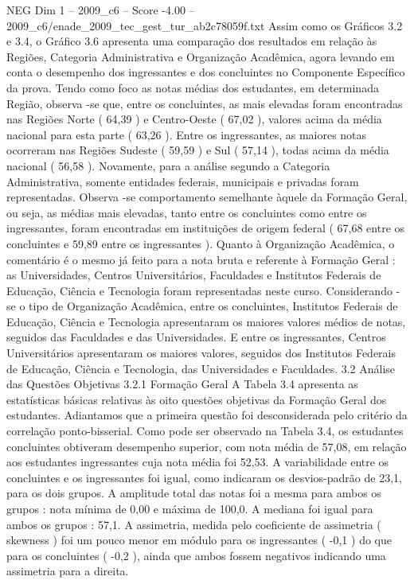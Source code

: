 \begin{textsample}{NEG Dim 1 – 2009\_c6 – Score -4.00 – 2009\_c6/enade\_2009\_tec\_gest\_tur\_ab2c78059f.txt}
Assim como os Gráficos 3.2 e 3.4, o Gráfico 3.6 apresenta uma comparação dos resultados em relação às Regiões, Categoria Administrativa e Organização Acadêmica, agora levando em conta o desempenho dos ingressantes e dos concluintes no Componente Específico da prova.
Tendo como foco as notas médias dos estudantes, em determinada Região, observa -se que, entre os concluintes, as mais elevadas foram encontradas nas Regiões Norte ( 64,39 ) e Centro-Oeste ( 67,02 ), valores acima da média nacional para esta parte ( 63,26 ).
Entre os ingressantes, as maiores notas ocorreram nas Regiões Sudeste ( 59,59 ) e Sul ( 57,14 ), todas acima da média nacional ( 56,58 ).
Novamente, para a análise segundo a Categoria Administrativa, somente entidades federais, municipais e privadas foram representadas.
Observa -se comportamento semelhante àquele da Formação Geral, ou seja, as médias mais elevadas, tanto entre os concluintes como entre os ingressantes, foram encontradas em instituições de origem federal ( 67,68 entre os concluintes e 59,89 entre os ingressantes ).
Quanto à Organização Acadêmica, o comentário é o mesmo já feito para a nota bruta e referente à Formação Geral : as Universidades, Centros Universitários, Faculdades e Institutos Federais de Educação, Ciência e Tecnologia foram representadas neste curso.
Considerando -se o tipo de Organização Acadêmica, entre os concluintes, Institutos Federais de Educação, Ciência e Tecnologia apresentaram os maiores valores médios de notas, seguidos das Faculdades e das Universidades.
E entre os ingressantes, Centros Universitários apresentaram os maiores valores, seguidos dos Institutos Federais de Educação, Ciência e Tecnologia, das Universidades e Faculdades. 3.2 Análise das Questões Objetivas 3.2.1 Formação Geral A Tabela 3.4 apresenta as estatísticas básicas relativas às oito questões objetivas da Formação Geral dos estudantes.
Adiantamos que a primeira questão foi desconsiderada pelo critério da correlação ponto-bisserial.
Como pode ser observado na Tabela 3.4, os estudantes concluintes obtiveram desempenho superior, com nota média de 57,08, em relação aos estudantes ingressantes cuja nota média foi 52,53.
A variabilidade entre os concluintes e os ingressantes foi igual, como indicaram os desvios-padrão de 23,1, para os dois grupos.
A amplitude total das notas foi a mesma para ambos os grupos : nota mínima de 0,00 e máxima de 100,0.
A mediana foi igual para ambos os grupos : 57,1.
A assimetria, medida pelo coeficiente de assimetria ( skewness ) foi um pouco menor em módulo para os ingressantes ( -0,1 ) do que para os concluintes ( -0,2 ), ainda que ambos fossem negativos indicando uma assimetria para a direita.

\end{textsample}
